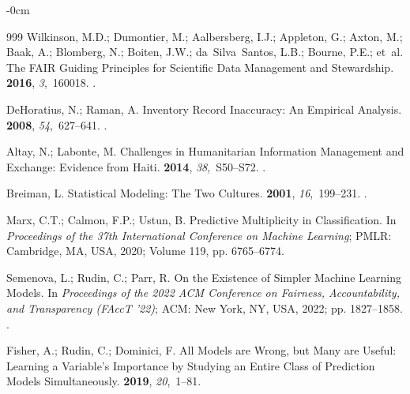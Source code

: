 \documentclass[systems,article,accept,moreauthors,pdftex]{Definitions/mdpi}
\begin{document}
\begin{adjustwidth}{-\extralength}{0cm}
\begin{thebibliography}{999}
Wilkinson, M.D.; Dumontier, M.; Aalbersberg, I.J.; Appleton, G.; Axton, M.;
  Baak, A.; Blomberg, N.; Boiten, J.W.; da~Silva~Santos, L.B.; Bourne, P.E.;
  et~al.
\newblock The {FAIR} Guiding Principles for Scientific Data Management and
  Stewardship.
 {\bf 2016}, {\em 3},~160018.
.

DeHoratius, N.; Raman, A.
\newblock Inventory Record Inaccuracy: An Empirical Analysis.
 {\bf 2008}, {\em 54},~627--641.
.

Altay, N.; Labonte, M.
\newblock Challenges in Humanitarian Information Management and Exchange:
  Evidence from {Haiti}.
 {\bf 2014}, {\em 38},~S50--S72.
.

Breiman, L.
\newblock Statistical Modeling: The Two Cultures.
 {\bf 2001}, {\em 16},~199--231.
.

Marx, C.T.; Calmon, F.P.; Ustun, B.
\newblock Predictive Multiplicity in Classification.
\newblock In \emph{Proceedings of the 37th International
  Conference on Machine Learning}; PMLR: Cambridge, MA, USA,  2020; Volume 119, pp. 6765--6774.

Semenova, L.; Rudin, C.; Parr, R.
\newblock On the Existence of Simpler Machine Learning Models.
\newblock In \emph{Proceedings of the  2022 ACM Conference on
  Fairness, Accountability, and Transparency (FAccT '22)}; ACM: New York, NY, USA,
  2022; pp. 1827--1858.
.

Fisher, A.; Rudin, C.; Dominici, F.
\newblock All Models are Wrong, but Many are Useful: Learning a Variable's
  Importance by Studying an Entire Class of Prediction Models Simultaneously.
 {\bf 2019}, {\em
  20},~1--81.


\end{thebibliography}
\end{adjustwidth}
\end{document}
